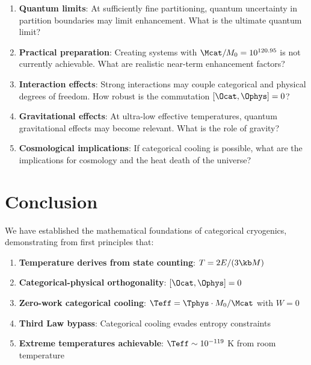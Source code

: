 \begin{enumerate}
    \item \textbf{Quantum limits}: At sufficiently fine partitioning, quantum uncertainty in partition boundaries may limit enhancement. What is the ultimate quantum limit?

    \item \textbf{Practical preparation}: Creating systems with $\Mcat/M_0 = 10^{120.95}$ is not currently achievable. What are realistic near-term enhancement factors?

    \item \textbf{Interaction effects}: Strong interactions may couple categorical and physical degrees of freedom. How robust is the commutation $[\Ocat, \Ophys] = 0$?

    \item \textbf{Gravitational effects}: At ultra-low effective temperatures, quantum gravitational effects may become relevant. What is the role of gravity?

    \item \textbf{Cosmological implications}: If categorical cooling is possible, what are the implications for cosmology and the heat death of the universe?
\end{enumerate}

\section{Conclusion}

We have established the mathematical foundations of categorical cryogenics, demonstrating from first principles that:

\begin{enumerate}
    \item \textbf{Temperature derives from state counting}: $T = 2E/(3\kb M)$

    \item \textbf{Categorical-physical orthogonality}: $[\Ocat, \Ophys] = 0$

    \item \textbf{Zero-work categorical cooling}: $\Teff = \Tphys \cdot M_0/\Mcat$ with $W = 0$

    \item \textbf{Third Law bypass}: Categorical cooling evades entropy constraints

    \item \textbf{Extreme temperatures achievable}: $\Teff \sim 10^{-119}$ K from room temperature
\end{enumerate}

